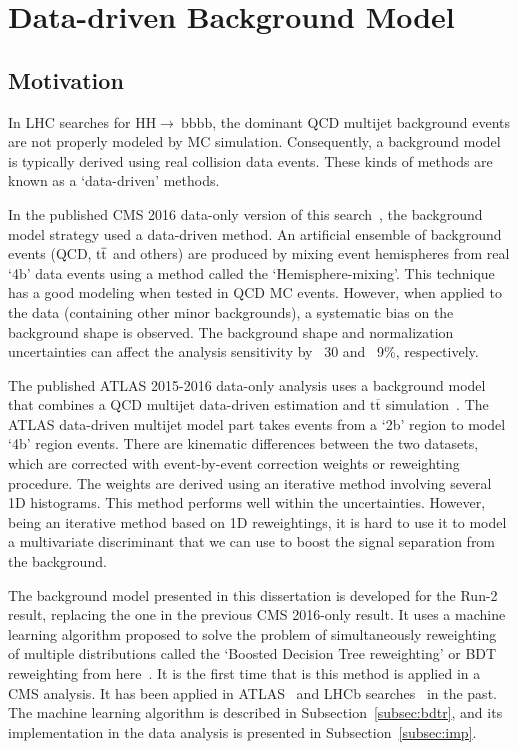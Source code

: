 \section{Data-driven Background Model}
\label{sec:backgroundmodel}
\subsection{Motivation}
In LHC searches for $\mathrm{HH\rightarrow~bbbb}$, the dominant QCD multijet background events are not properly modeled by MC simulation. Consequently, a background model is typically derived using real collision data events. These kinds of methods are known as a `data-driven' methods.

In the published CMS 2016 data-only version of this search~\cite{bbbbcmsnr}, the background model strategy used a data-driven method. An artificial ensemble of background events (QCD, $\mathrm{t\overline{t}}$ and others) are produced by mixing event hemispheres from real `4b' data events using a method called the `Hemisphere-mixing'. This technique has a good modeling when tested in QCD MC events. However, when applied to the data (containing other minor backgrounds), a systematic bias on the background shape is observed. The background shape and normalization uncertainties can affect the analysis sensitivity by ~30 and ~9\%, respectively. 

The published ATLAS 2015-2016 data-only analysis uses a background model that combines a QCD multijet data-driven estimation and $\mathrm{t\overline{t}}$ simulation~\cite{bbbbatlas}. The ATLAS data-driven multijet model part takes events from a `2b' region to model `4b' region events. There are kinematic differences between the two datasets, which are corrected with event-by-event correction weights or reweighting procedure. The weights are derived using an iterative method involving several 1D histograms. This method performs well within the uncertainties. However, being an iterative method based on 1D reweightings, it is hard to use it to model a multivariate discriminant that we can use to boost the signal separation from the background.

The background model presented in this dissertation is developed for the Run-2 result, replacing the one in the previous CMS 2016-only result. It uses a machine learning algorithm proposed to solve the problem of simultaneously reweighting of multiple distributions called the `Boosted Decision Tree reweighting' or BDT reweighting from here~\cite{Rogozhnikov:2016bdp}. It is the first time that is this method is applied in a CMS analysis. It has been applied in ATLAS~\cite{ATLAS:2018tti,ATLAS:2020qiz} and LHCb searches~\cite{LHCb:2016jrk} in the past. The machine learning algorithm is described in Subsection~\ref{subsec:bdtr}, and its implementation in the data analysis is presented in Subsection~\ref{subsec:imp}.


